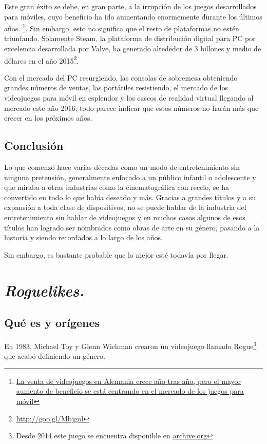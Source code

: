 Este gran éxito se debe, en gran parte, a la irrupción de los juegos desarrollados para móviles, cuyo beneficio ha ido aumentando enormemente durante los últimos años. \footnote{\href{http://goo.gl/Lz9UAa}{La venta de videojuegos en Alemania crece año tras año, pero el mayor aumento de beneficio se está centrando en el mercado de los juegos para móvil}}. Sin embargo, esto no significa que el resto de plataformas no estén triunfando. Solamente Steam, la plataforma de distribución digital para PC por excelencia desarrollada por Valve, ha generado alrededor de 3 billones y medio de dólares en el año 2015\footnote{\url{http://goo.gl/Mbjgol}}.

Con el mercado del PC resurgiendo, las consolas de sobremesa obteniendo grandes números de ventas, las portátiles resistiendo, el mercado de los videojuegos para móvil en esplendor y los cascos de realidad virtual llegando al mercado este año 2016; todo parece indicar que estos números no harán más que crecer en los próximos años.

\subsection{Conclusión}

Lo que comenzó hace varias décadas como un modo de entretenimiento sin ninguna pretensión, generalmente enfocado a un público infantil o adolescente y que miraba a otras industrias como la cinematográfica con recelo, se ha convertido en todo lo que había deseado y más. Gracias a grandes títulos y a su expansión a toda clase de dispositivos, no se puede hablar de la industria del entretenimiento sin hablar de videojuegos y en muchos casos algunos de esos títulos han logrado ser nombrados como obras de arte en su género, pasando a la historia y siendo recordados a lo largo de los años.

Sin embargo, es bastante probable que lo mejor esté todavía por llegar.

\section{\textit{Roguelikes.}}

\subsection{Qué es y orígenes}

En 1983, Michael Toy y Glenn Wichman crearon un videojuego llamado Rogue\footnote{Desde 2014 este juego se encuentra disponible en \href{https://archive.org/details/msdos_Rogue_1983}{archive.org}} que acabó definiendo un género.

